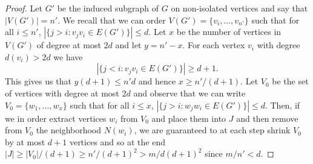 \documentclass[10pt,a4paper]{amsart}
\begin{document}
\begin{proof}
Let $G'$ be the induced subgraph of $G$ on non-isolated vertices and say that $|V(G')|=n'$. We recall that we can order $V(G')=\{v_i,...,v_{n'}\}$ such that for all $i\leq n'$, $|\{j>i:v_jv_i\in E(G')\}|\leq d$. Let $x$ be the number of vertices in $V(G')$ of degree at most $2d$ and let $y=n'-x$. For each vertex $v_i$ with  degree $d(v_i)>2d$ we have $$|\{j<i:v_jv_i\in E(G')\}|\geq d+1.$$ This gives us that $y(d+1)\leq n'd$ and hence $x\geq n'/(d+1)$. Let $V_0$ be the set of vertices with degree at most $2d$ and observe that we can write $V_0=\{w_1,...,w_{x}\}$ such that for all $i\leq x$, $|\{j>i:w_jw_i\in E(G')\}|\leq d$. Then, if we in order extract vertices $w_i$ from $V_0$ and place them into $J$ and then remove from $V_0$ the neighborhood $N(w_i)$, we are guaranteed to at each step shrink $V_0$ by at most $d+1$ vertices and so at the end $|J|\geq  |V_0|/(d+1)\geq n'/(d+1)^2> m/d(d+1)^2$ since $m/n'< d$.
\end{proof}
\end{document}
